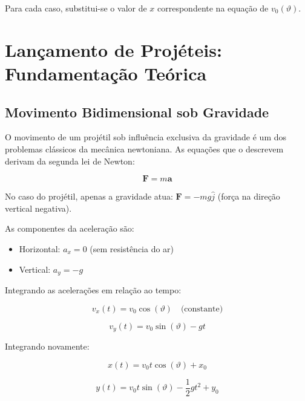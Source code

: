 \documentclass[12pt,a4paper]{article}
\begin{document}
Para cada caso, substitui-se o valor de $x$ correspondente na equação de $v_0(\vartheta)$.

\newpage


\section{Lançamento de Projéteis: Fundamentação Teórica}

\subsection{Movimento Bidimensional sob Gravidade}

O movimento de um projétil sob influência exclusiva da gravidade é um dos problemas clássicos da mecânica newtoniana. As equações que o descrevem derivam da segunda lei de Newton:

\begin{equation}
\mathbf{F} = m\mathbf{a}
\end{equation}

No caso do projétil, apenas a gravidade atua: $\mathbf{F} = -mg\hat{j}$ (força na direção vertical negativa).

As componentes da aceleração são:
\begin{itemize}
    \item Horizontal: $a_x = 0$ (sem resistência do ar)
    \item Vertical: $a_y = -g$
\end{itemize}

Integrando as acelerações em relação ao tempo:

\begin{equation}
v_x(t) = v_0 \cos(\vartheta) \quad \text{(constante)}
\end{equation}

\begin{equation}
v_y(t) = v_0 \sin(\vartheta) - gt
\end{equation}

Integrando novamente:

\begin{equation}
x(t) = v_0 t \cos(\vartheta) + x_0
\end{equation}

\begin{equation}
y(t) = v_0 t \sin(\vartheta) - \frac{1}{2}gt^2 + y_0
\end{equation}
\end{document}
